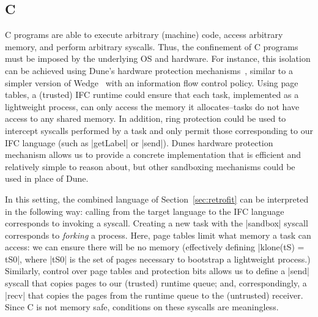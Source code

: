 \subsection{C}
\label{sec:real:c}
%
C programs are able to execute arbitrary (machine) code, access
arbitrary memory, and perform arbitrary syscalls.
%
Thus, the confinement of C programs must be imposed by the underlying OS
and hardware.
%
For instance, this isolation can be achieved using Dune's hardware protection
mechanisms~\cite{Belay:2012:DSU:2387880.2387913}, similar to a simpler
version of Wedge~\cite{Belay:2012:DSU:2387880.2387913,
Bittau:2008:WSA:1387589.1387611} with an information flow control
policy.
%
Using page tables, a (trusted) IFC runtime could ensure that each task,
implemented as a lightweight process, can only access the memory it
allocates--tasks do not have access to any shared memory.
%
In addition, ring protection could be used to intercept syscalls performed by
a task and only permit those corresponding to our IFC language (such as
|getLabel| or |send|).
%
Dunes hardware protection mechanism allows us to provide a concrete
implementation that is efficient and relatively simple to reason
about, but other sandboxing mechanisms could be used in place of Dune.

In this setting, the combined language of Section~\ref{sec:retrofit}
can be interpreted in the following way: calling from the target
language to the IFC language corresponds to invoking a syscall.
%
Creating a new task with the |sandbox| syscall corresponds to
\emph{forking} a process.  Here, page tables limit what memory
a task can access: we can ensure there will be no memory (effectively
defining |klone(tS)
= tS0|, where |tS0| is the set of pages necessary to bootstrap a
lightweight process.)
%
Similarly, control over page tables and protection bits allows us to
define a |send| syscall that copies pages to our
(trusted) runtime queue; and, correspondingly, a |recv| that copies
the pages from the runtime queue to the (untrusted) receiver.
%
Since C is not memory safe, conditions on these syscalls are
meaningless.
